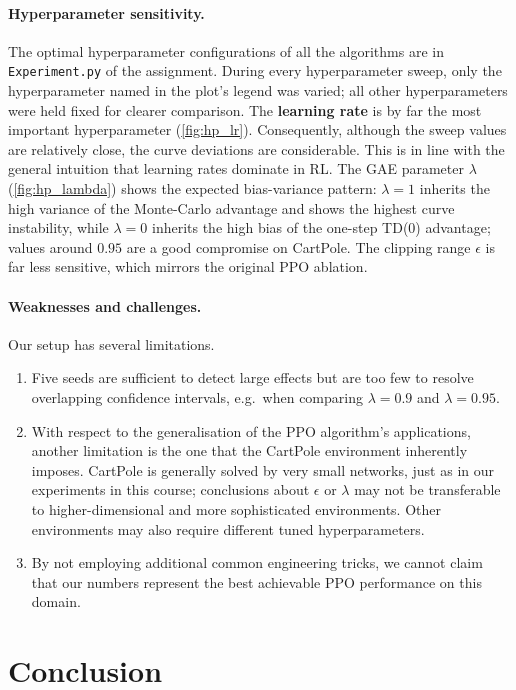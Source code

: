 \documentclass{article}
\theoremstyle{plain}
\theoremstyle{definition}
\theoremstyle{remark}
\begin{document}
\paragraph{Hyperparameter sensitivity.}
The optimal hyperparameter configurations of all the algorithms are in \texttt{Experiment.py} of the assignment.
During every hyperparameter sweep, only the hyperparameter named in the plot's legend was varied; all other hyperparameters were held fixed for clearer comparison.
The \textbf{learning rate} is by far the most important hyperparameter (\autoref{fig:hp_lr}). Consequently, although the sweep values are relatively close, the curve deviations are considerable. This is in line with the general intuition that learning rates dominate in RL. The GAE parameter $\lambda$ (\autoref{fig:hp_lambda}) shows the expected bias-variance pattern: $\lambda=1$ inherits the high variance of the Monte-Carlo advantage and shows the highest curve instability, while $\lambda=0$ inherits the high bias of the one-step TD(0) advantage; values around $0.95$ are a good compromise on CartPole. The clipping range $\epsilon$ is far less sensitive, which mirrors the original PPO ablation.

\paragraph{Weaknesses and challenges.}
Our setup has several limitations.
\begin{enumerate}
    \item Five seeds are sufficient to detect large effects but are too few to resolve overlapping confidence intervals, e.g.\ when comparing $\lambda=0.9$ and $\lambda=0.95$.
    \item With respect to the generalisation of the PPO algorithm's applications, another limitation is the one that the CartPole environment inherently imposes. CartPole is generally solved by very small networks, just as in our experiments in this course; conclusions about $\epsilon$ or $\lambda$ may not be transferable to higher-dimensional and more sophisticated environments. Other environments may also require different tuned hyperparameters.
    \item By not employing additional common engineering tricks, we cannot claim that our numbers represent the best achievable PPO performance on this domain.
\end{enumerate}

\section{Conclusion}\label{sec:conclusion}
\end{document}
